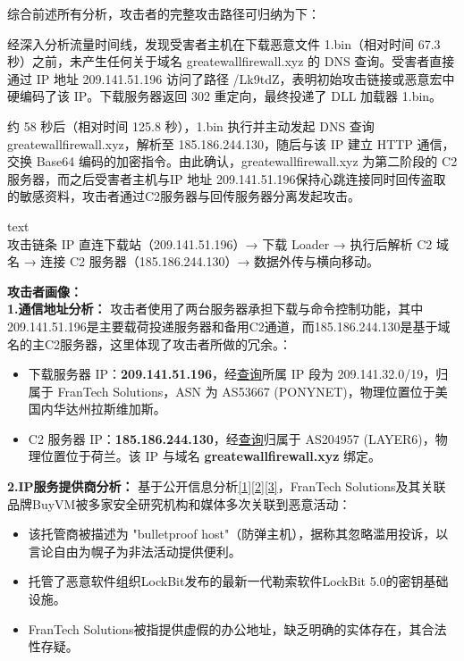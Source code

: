 \documentclass[12pt]{ctexart}
\begin{document}
		综合前述所有分析，攻击者的完整攻击路径可归纳为下：

			经深入分析流量时间线，发现受害者主机在下载恶意文件 1.bin（相对时间 67.3 秒）之前，未产生任何关于域名 greatewallfirewall.xyz 的 DNS 查询。受害者直接通过 IP 地址 209.141.51.196 访问了路径 /Lk9tdZ，表明初始攻击链接或恶意宏中硬编码了该 IP。下载服务器返回 302 重定向，最终投递了 DLL 加载器 1.bin。
			
			约 58 秒后（相对时间 125.8 秒），1.bin 执行并主动发起 DNS 查询 greatewallfirewall.xyz，解析至 185.186.244.130，随后与该 IP 建立 HTTP 通信，交换 Base64 编码的加密指令。由此确认，greatewallfirewall.xyz 为第二阶段的 C2 服务器，而之后受害者主机与IP 地址 209.141.51.196保持心跳连接同时回传盗取的敏感资料，攻击者通过C2服务器与回传服务器分离发起攻击。
			\begin{codeblock}{text}
\\ 攻击链条
IP 直连下载站（209.141.51.196）→ 下载 Loader → 执行后解析 C2 域名 → 连接 C2 服务器（185.186.244.130）→ 数据外传与横向移动。
			\end{codeblock}			
		
	\vspace*{\baselineskip}
	\noindent
	\textbf{攻击者画像：}\\
	\hspace*{2em}\textbf{1.通信地址分析：}
	攻击者使用了两台服务器承担下载与命令控制功能，其中209.141.51.196是主要载荷投递服务器和备用C2通道，而185.186.244.130是基于域名的主C2服务器，这里体现了攻击者所做的冗余。：
	\begin{itemize}
		\item 下载服务器 IP：\textbf{209.141.51.196}，经\href{https://whois.ipip.net/}{查询}所属 IP 段为 209.141.32.0/19，归属于 FranTech Solutions，ASN 为 AS53667 (PONYNET)，物理位置位于美国内华达州拉斯维加斯。
		\item C2 服务器 IP：\textbf{185.186.244.130}，经\href{https://whois.ipip.net/}{查询}归属于 AS204957 (LAYER6)，物理位置位于荷兰。该 IP 与域名 \textbf{greatewallfirewall.xyz} 绑定。
	\end{itemize}
	
	\textbf{2.IP服务提供商分析：}
	基于公开信息分析\href{https://www.infosecurity-magazine.com/news/us-web-servers-hosted-10-malware-1/}{[1]}\href{https://cybersecuritynews.com/lockbit-5-0-infrastructure-exposed/}{[2]}\href{https://uk.trustpilot.com/review/frantechusa.com}{[3]}，FranTech Solutions及其关联品牌BuyVM被多家安全研究机构和媒体多次关联到恶意活动：
	\begin{itemize}
		\item 该托管商被描述为 "bulletproof host"（防弹主机），据称其忽略滥用投诉，以言论自由为幌子为非法活动提供便利。
		\item 托管了恶意软件组织LockBit发布的最新一代勒索软件LockBit 5.0的密钥基础设施。
		\item FranTech Solutions被指提供虚假的办公地址，缺乏明确的实体存在，其合法性存疑。
	\end{itemize}
	
\end{document}

